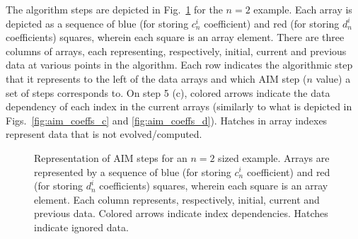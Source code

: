 %
The algorithm steps are depicted in Fig.~\ref{fig:arrays_steps} for the $n=2$ example. Each array is depicted as a sequence of blue (for storing $c^i_n$ coefficient) and red (for storing $d^i_n$ coefficients) squares, wherein each square is an array element. There are three columns of arrays, each representing, respectively, initial, current and previous data at various points in the algorithm. Each row indicates the algorithmic step that it represents to the left of the data arrays and which AIM step ($n$ value) a set of steps corresponds to. On step 5 (c), colored arrows indicate the data dependency of each index in the current arrays (similarly to what is depicted in Figs.~\ref{fig:aim_coeffs_c} and \ref{fig:aim_coeffs_d}). Hatches in array indexes represent data that is not evolved/computed.
%
\begin{figure}[!ht]
  \centering
  \fontsize{9}{10}\selectfont
  
  \caption{Representation of AIM steps for an $n=2$ sized example. Arrays are represented by a sequence of blue (for storing $c^i_n$ coefficient) and red (for storing $d^i_n$ coefficients) squares, wherein each square is an array element. Each column represents, respectively, initial, current and previous data. Colored arrows indicate index dependencies. Hatches indicate ignored data.}
  \label{fig:arrays_steps}
\end{figure}